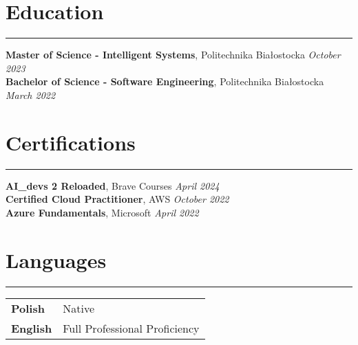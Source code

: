 \documentclass[10pt, a4paper]{article} %
\begin{document}
\vspace{0.5cm}

\section*{Education}
\hrule
\vspace{0.2cm}
\textbf{Master of Science - Intelligent Systems}, Politechnika Białostocka \hfill \textit{October 2023} \\
\textbf{Bachelor of Science - Software Engineering}, Politechnika Białostocka \hfill \textit{March 2022} \\

\vspace{0.5cm}

\section*{Certifications}
\hrule
\vspace{0.2cm}
\textbf{AI\_devs 2 Reloaded}, Brave Courses \hfill \textit{April 2024} \\
\textbf{Certified Cloud Practitioner}, AWS \hfill \textit{October 2022} \\
\textbf{Azure Fundamentals}, Microsoft \hfill \textit{April 2022} \\

\vspace{0.5cm}

\section*{Languages}
\hrule
\vspace{0.2cm}
\begin{tabular}{@{}ll}
    \textbf{Polish} & Native \\
    \textbf{English} & Full Professional Proficiency \\
\end{tabular}
\end{document}

